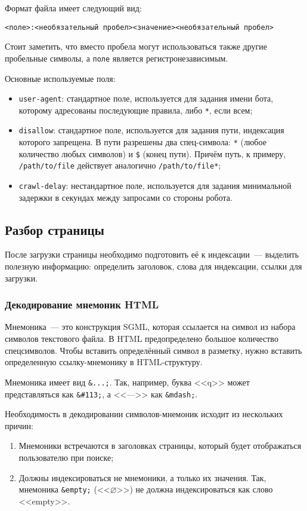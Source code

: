 Формат файла имеет следующий вид:
\begin{verbatim}
<поле>:<необязательный пробел><значение><необязательный пробел>
\end{verbatim}

Стоит заметить, что вместо пробела могут использоваться также другие пробельные символы, а \verb|поле| является регистронезависимым.

Основные используемые поля:
\begin{itemize}
  \item \verb|user-agent|: стандартное поле, используется для задания имени бота, которому адресованы последующие правила, либо \verb|*|, если всем;
  \item \verb|disallow|: стандартное поле, используется для задания пути, индексация которого запрещена. В пути разрешены два спец-символа: \verb|*| (любое количество любых символов) и \verb|$| (конец пути). Причём путь, к примеру, \verb|/path/to/file| действует аналогично \verb|/path/to/file*|;
  \item \verb|crawl-delay|: нестандартное поле, используется для задания минимальной задержки в секундах между запросами со стороны робота.
\end{itemize}


\subsection{Разбор страницы}
После загрузки страницы необходимо подготовить её к индексации~--- выделить полезную информацию: определить заголовок, слова для индексации, ссылки для загрузки.


\subsubsection{Декодирование мнемоник HTML}
Мнемоника~--- это конструкция SGML, которая ссылается на символ из набора символов текстового файла. В HTML предопределено большое количество спецсимволов. Чтобы вставить определённый символ в разметку, нужно вставить определенную ссылку-мнемонику в HTML-структуру.

Мнемоника имеет вид \verb|&...;|. Так, например, буква <<q>> может представляться как \verb|&#113;|, а <<--->> как \verb|&mdash;|.

Необходимость в декодировании символов-мнемоник исходит из нескольких причин:
\begin{enumerate}
  \item Мнемоники встречаются в заголовках страницы, который будет отображаться пользователю при поиске;
  \item Должны индексироваться не мнемоники, а только их значения. Так, мнемоника \verb|&empty;| (<<$\varnothing$>>) не должна индексироваться как слово <<empty>>.
\end{enumerate}


